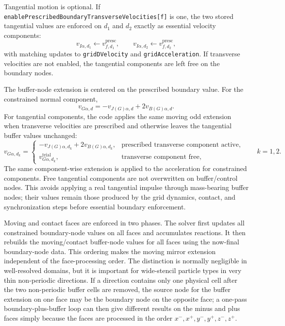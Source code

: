 Tangential motion is optional.  If \texttt{enablePrescribedBoundaryTransverseVelocities[f]} is one, the two stored tangential values are enforced on $d_1$ and $d_2$ exactly as essential velocity components:
\begin{equation}
  v_{I\alpha,d_1}\leftarrow v_{f,d_1}^{\mathrm{presc}},
  \qquad
  v_{I\alpha,d_2}\leftarrow v_{f,d_2}^{\mathrm{presc}},
  \label{eq:bc-moving-transverse}
\end{equation}
with matching updates to \texttt{gridDVelocity} and \texttt{gridAcceleration}.  If transverse velocities are not enabled, the tangential components are left free on the boundary nodes.

The buffer-node extension is centered on the prescribed boundary value.  For the constrained normal component,
\begin{equation}
  v_{G\alpha,d}=-v_{J(G)\alpha,d}+2v_{B(G)\alpha,d}.
  \label{eq:bc-moving-buffer-normal}
\end{equation}
For tangential components, the code applies the same moving odd extension when transverse velocities are prescribed and otherwise leaves the tangential buffer values unchanged:
\begin{equation}
  v_{G\alpha,d_k}=\begin{cases}
    -v_{J(G)\alpha,d_k}+2v_{B(G)\alpha,d_k}, & \text{prescribed transverse component active},\\
     v_{G\alpha,d_k}^{\mathrm{trial}}, & \text{transverse component free},
  \end{cases}
  \qquad k=1,2.
  \label{eq:bc-moving-buffer-tangent}
\end{equation}
The same component-wise extension is applied to the acceleration for constrained components.  Free tangential components are not overwritten on buffer/control nodes.  This avoids applying a real tangential impulse through mass-bearing buffer nodes; their values remain those produced by the grid dynamics, contact, and synchronization steps before essential boundary enforcement.

Moving and contact faces are enforced in two phases.  The solver first updates all constrained boundary-node values on all faces and accumulates reactions.  It then rebuilds the moving/contact buffer-node values for all faces using the now-final boundary-node data.  This ordering makes the moving mirror extension independent of the face-processing order.  The distinction is normally negligible in well-resolved domains, but it is important for wide-stencil particle types in very thin non-periodic directions.  If a direction contains only one physical cell after the two non-periodic buffer cells are removed, the source node for the buffer extension on one face may be the boundary node on the opposite face; a one-pass boundary-plus-buffer loop can then give different results on the minus and plus faces simply because the faces are processed in the order $x^-,x^+,y^-,y^+,z^-,z^+$.

